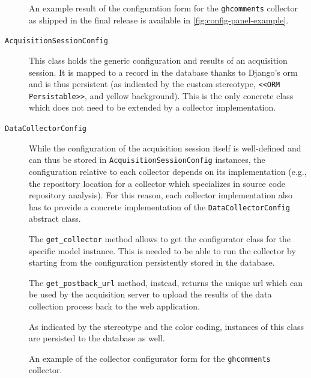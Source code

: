 \begin{description}
    An example result of the configuration form for the \texttt{ghcomments} collector as shipped in the final release is available in \vref{fig:config-panel-example}.

  \item[\texttt{AcquisitionSessionConfig}] This class holds the generic configuration and results of an acquisition session. It is mapped to a record in the database thanks to Django's \gls{orm} and is thus persistent (as indicated by the custom stereotype, \texttt{<<ORM Persistable>>}, and yellow background). This is the only concrete class which does not need to be extended by a collector implementation.

  \item[\texttt{DataCollectorConfig}] While the configuration of the acquisition session itself is well-defined and can thus be stored in \texttt{AcquisitionSessionConfig} instances, the configuration relative to each collector depends on its implementation (e.g., the repository location for a collector which specializes in source code repository analysis). For this reason, each collector implementation also has to provide a concrete implementation of the \texttt{DataCollectorConfig} abstract class.

    The \texttt{get\_collector} method allows to get the configurator class for the specific model instance. This is needed to be able to run the collector by starting from the configuration persistently stored in the database.

    The \texttt{get\_postback\_url} method, instead, returns the unique \gls{url} which can be used by the acquisition server to upload the results of the data collection process back to the web application.

    As indicated by the stereotype and the color coding, instances of this class are persisted to the database as well.
\end{description}

\begin{figure}
	\hfill
  \caption{An example of the collector configurator form for the \texttt{ghcomments} collector.}
  \label{fig:config-panel-example}
\end{figure}

